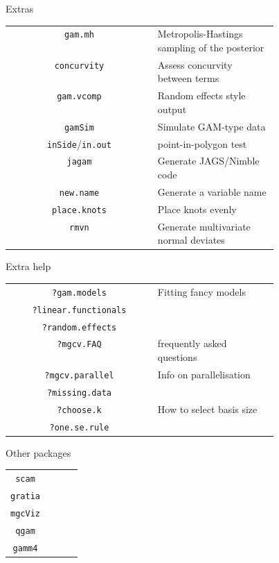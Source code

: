 
\begin{block}{Extras}
  \small\renewcommand{\arraystretch}{1.5}
  \begin{tabular}{c >{} p{0.45\linewidth}}
    \texttt{gam.mh} & Metropolis-Hastings sampling of the posterior\\
    \texttt{concurvity} & Assess concurvity between terms\\
    \texttt{gam.vcomp} & Random effects style output\\
    \texttt{gamSim} & Simulate GAM-type data\\
    \texttt{inSide}/\texttt{in.out} & point-in-polygon test\\
    \texttt{jagam} & Generate JAGS/Nimble code\\
    \texttt{new.name} & Generate a variable name\\
    \texttt{place.knots} & Place knots evenly\\
    \texttt{rmvn} & Generate multivariate normal deviates\\
  \end{tabular}
\end{block}

\begin{block}{Extra help}
  \small\renewcommand{\arraystretch}{1.5}
  \begin{tabular}{c >{} p{0.45\linewidth}}
    \texttt{?gam.models} & Fitting fancy models\\
    \texttt{?linear.functionals} & \\
    \texttt{?random.effects} & \\
    \texttt{?mgcv.FAQ} & frequently asked questions\\
    \texttt{?mgcv.parallel} & Info on parallelisation\\
    \texttt{?missing.data} & \\
    \texttt{?choose.k} & How to select basis size\\
    \texttt{?one.se.rule} & \\
  \end{tabular}
\end{block}


\begin{block}{Other packages}
  \small\renewcommand{\arraystretch}{1.5}
  \begin{tabular}{c >{} p{0.45\linewidth}}
    \texttt{scam} & \\
    \texttt{gratia} & \\
    \texttt{mgcViz} & \\
    \texttt{qgam} & \\
    \texttt{gamm4} & \\
  \end{tabular}
\end{block}
